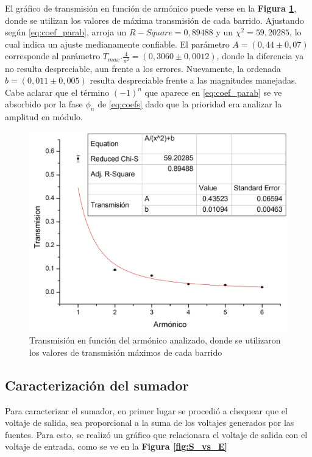 \documentclass[11pt,a4paper]{article}
\begin{document}
El gráfico de transmisión en función de armónico puede verse en la \textbf{Figura \ref{fig:transparab}}, donde se utilizan los valores de máxima transmisión de cada barrido. Ajustando según \eqref{eq:coef_parab}, arroja un $R-Square = 0,89488$ y un $\chi^2 = 59,20285$, lo cual indica un ajuste medianamente confiable. El parámetro $A = (0,44 \pm 0,07)$ corresponde al parámetro $T_{max}.\frac{4}{\pi^2} = (0,3060 \pm 0,0012)$, donde la diferencia ya no resulta despreciable, aun frente a los errores. Nuevamente, la ordenada $b = (0,011 \pm 0,005)$ resulta despreciable frente a las magnitudes manejadas. Cabe aclarar que el término $(-1)^n$ que aparece en \eqref{eq:coef_parab} se ve absorbido por la fase $\phi_n$ de \eqref{eq:coefs} dado que la prioridad era analizar la amplitud en módulo. 

\begin{figure}[h]
\centering
\includegraphics[scale=0.35]{Trans_vs_Arm_Parab}
\caption{Transmisión en función del armónico analizado, donde se utilizaron los valores de transmisión máximos de cada barrido}
\label{fig:transparab}
\end{figure}

\subsection{Caracterización del sumador}

Para caracterizar el sumador, en primer lugar se procedió a chequear que el voltaje de salida, sea proporcional a la suma de los voltajes generados por las fuentes. Para esto, se realizó un gráfico que relacionara el voltaje de salida con el voltaje de entrada, como se ve en la \textbf{Figura \ref{fig:S_vs_E}}
\end{document}
